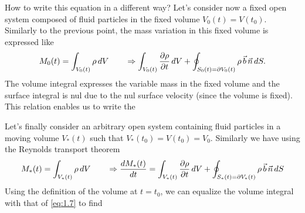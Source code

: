	How to write this equation in a different way? Let's consider now a fixed open system composed of fluid particles in the fixed volume $V_0(t) = V(t_0)$. Similarly to the previous point, the mass variation in this fixed volume is expressed like 
	\begin{equation}
		M_0(t) = \int _{V_0(t)} \rho\, dV \qquad 
		\Rightarrow \int _{V_0(t)} \frac{\partial \rho}{\partial t}\, dV + \oint _{S_0(t) = \partial V_0(t)} \rho\, \vec{b}\, \vec{n}\, dS.
	\end{equation}
	The volume integral expresses the variable mass in the fixed volume and the surface integral is nul due to the nul surface velocity (since the volume is fixed). This relation enables us to write the 
	\begin{center}
	\end{center}	
	Let's finally consider an arbitrary open system containing fluid particles in a moving volume $V_*(t)$ such that $V_*(t_0) = V(t_0) = V_0$. Similarly we have using the Reynolds transport theorem
	\begin{equation}
		M_*(t) = \int _{V_*(t)} \rho\, dV \qquad \Rightarrow \frac{dM_*(t)}{dt} = \int _{V_*(t)} \frac{\partial \rho}{\partial t}\, dV + \oint _{S_*(t) = \partial V_*(t)} \rho\, \vec{b}\, \vec{n}\, dS
	\end{equation}
	Using the definition of the volume at $t=t_0$, we can equalize the volume integral with that of \eqref{eq:1.7} to find 
	\begin{center}
	\end{center}	
	
